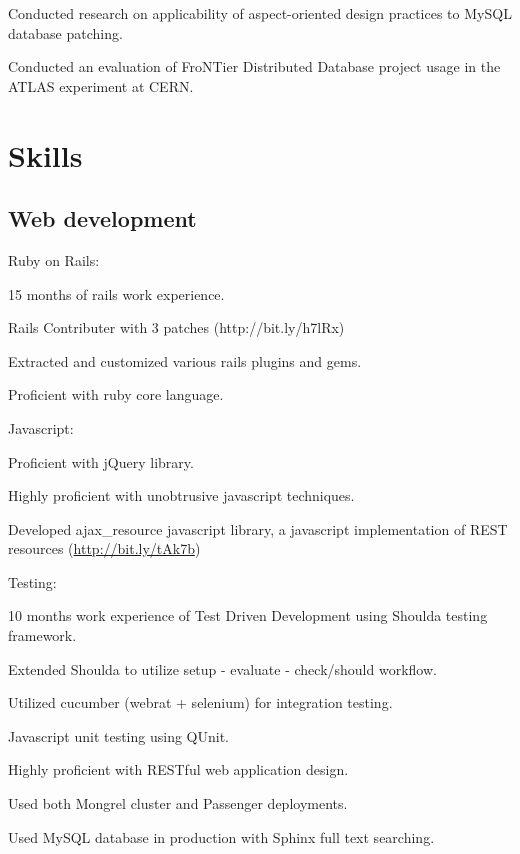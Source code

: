 \documentclass{resume}
\begin{document}
\begin{compactitem}
  \item Conducted research on applicability of aspect-oriented design practices to MySQL database patching.
  \item Conducted an evaluation of FroNTier Distributed Database project usage in the ATLAS experiment at CERN.
\end{compactitem}

\section{Skills}

\subsection{Web development}

\begin{compactitem}
  \item Ruby on Rails:
    \begin{compactitem}
      \item 15 months of rails work experience.
      \item Rails Contributer with 3 patches (http://bit.ly/h7lRx)
      \item Extracted and customized various rails plugins and gems.
      \item Proficient with ruby core language.
    \end{compactitem}

  \item Javascript:
    \begin{compactitem}
      \item Proficient with jQuery library.
      \item Highly proficient with unobtrusive javascript techniques.
      \item Developed ajax\_resource javascript library, a javascript implementation of REST resources (\url{http://bit.ly/tAk7b})
    \end{compactitem}

  \item Testing:
    \begin{compactitem}
      \item 10 months work experience of Test Driven Development using Shoulda testing framework.
      \item Extended Shoulda to utilize setup - evaluate - check/should workflow.
      \item Utilized cucumber (webrat + selenium) for integration testing.
      \item Javascript unit testing using QUnit.
    \end{compactitem}

  \item Highly proficient with RESTful web application design.
  \item Used both Mongrel cluster and Passenger deployments.
  \item Used MySQL database in production with Sphinx full text searching.
\end{compactitem}
\end{document}
